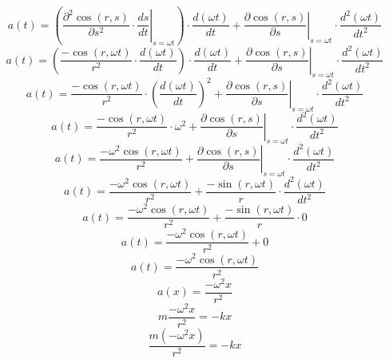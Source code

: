\documentclass[a4paper,12pt]{report}
\begin{document}
\begin{equation}
a(t) = \left(\left.\frac{\partial^2 \cos(r,s)}{\partial s^2} \cdot \frac{ds}{dt}\right|_{s = \omega t}\right) \cdot \frac{d (\omega t)}{dt} + \left.\frac{\partial \cos(r,s)}{\partial s}\right|_{s = \omega t} \cdot \frac{d^2 (\omega t)}{dt^2}
\end{equation}
\begin{equation}
a(t) = \left(\frac{-\cos(r,\omega t)}{r^2} \cdot \frac{d (\omega t)}{dt}\right) \cdot \frac{d (\omega t)}{dt} + \left.\frac{\partial \cos(r,s)}{\partial s}\right|_{s = \omega t} \cdot \frac{d^2 (\omega t)}{dt^2}
\end{equation}
\begin{equation}
a(t) = \frac{-\cos(r,\omega t)}{r^2} \cdot \left(\frac{d (\omega t)}{dt}\right)^2 + \left.\frac{\partial \cos(r,s)}{\partial s}\right|_{s = \omega t} \cdot \frac{d^2 (\omega t)}{dt^2}
\end{equation}
\begin{equation}
a(t) = \frac{-\cos(r,\omega t)}{r^2} \cdot \omega^2 + \left.\frac{\partial \cos(r,s)}{\partial s}\right|_{s = \omega t} \cdot \frac{d^2 (\omega t)}{dt^2}
\end{equation}
\begin{equation}
a(t) = \frac{-\omega^2 \cos(r,\omega t)}{r^2} + \left.\frac{\partial \cos(r,s)}{\partial s}\right|_{s = \omega t} \cdot \frac{d^2 (\omega t)}{dt^2}
\end{equation}
\begin{equation}
a(t) = \frac{-\omega^2 \cos(r,\omega t)}{r^2} + \frac{-\sin(r,\omega t)}{r} \cdot \frac{d^2 (\omega t)}{dt^2}
\end{equation}
\begin{equation}
a(t) = \frac{-\omega^2 \cos(r,\omega t)}{r^2} + \frac{-\sin(r,\omega t)}{r} \cdot 0
\end{equation}
\begin{equation}
a(t) = \frac{-\omega^2 \cos(r,\omega t)}{r^2} + 0
\end{equation}
\begin{equation}
a(t) = \frac{-\omega^2 \cos(r,\omega t)}{r^2}
\end{equation}
\begin{equation}
a(x) = \frac{-\omega^2 x}{r^2}
\end{equation}
\begin{equation}
m \frac{-\omega^2 x}{r^2} = -kx
\end{equation}
\begin{equation}
\frac{m (-\omega^2 x)}{r^2} = -kx
\end{equation}
\end{document}
